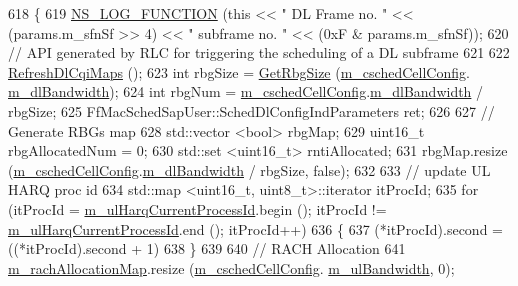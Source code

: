 \begin{DoxyCode}
618 \{
619   \hyperlink{log-macros-disabled_8h_a90b90d5bad1f39cb1b64923ea94c0761}{NS\_LOG\_FUNCTION} (\textcolor{keyword}{this} << \textcolor{stringliteral}{" DL Frame no. "} << (params.m\_sfnSf >> 4) << \textcolor{stringliteral}{" subframe no. "} << 
      (0xF & params.m\_sfnSf));
620   \textcolor{comment}{// API generated by RLC for triggering the scheduling of a DL subframe}
621 
622   \hyperlink{classns3_1_1RrFfMacScheduler_a537ddfed33bced7f9a5762128e025ece}{RefreshDlCqiMaps} ();
623   \textcolor{keywordtype}{int} rbgSize = \hyperlink{classns3_1_1RrFfMacScheduler_a65de621ce59a64d6b0a3a56c3904470a}{GetRbgSize} (\hyperlink{classns3_1_1RrFfMacScheduler_a809c6237863709f97fc450b1a2ba60d4}{m\_cschedCellConfig}.
      \hyperlink{structns3_1_1FfMacCschedSapProvider_1_1CschedCellConfigReqParameters_ad18c695bd3c9d7f742ba1dab4a941e8a}{m\_dlBandwidth});
624   \textcolor{keywordtype}{int} rbgNum = \hyperlink{classns3_1_1RrFfMacScheduler_a809c6237863709f97fc450b1a2ba60d4}{m\_cschedCellConfig}.\hyperlink{structns3_1_1FfMacCschedSapProvider_1_1CschedCellConfigReqParameters_ad18c695bd3c9d7f742ba1dab4a941e8a}{m\_dlBandwidth} / rbgSize;
625   FfMacSchedSapUser::SchedDlConfigIndParameters ret;
626 
627   \textcolor{comment}{// Generate RBGs map}
628   std::vector <bool> rbgMap;
629   uint16\_t rbgAllocatedNum = 0;
630   std::set <uint16\_t> rntiAllocated;
631   rbgMap.resize (\hyperlink{classns3_1_1RrFfMacScheduler_a809c6237863709f97fc450b1a2ba60d4}{m\_cschedCellConfig}.\hyperlink{structns3_1_1FfMacCschedSapProvider_1_1CschedCellConfigReqParameters_ad18c695bd3c9d7f742ba1dab4a941e8a}{m\_dlBandwidth} / rbgSize, \textcolor{keyword}{false});
632 
633   \textcolor{comment}{//   update UL HARQ proc id}
634   std::map <uint16\_t, uint8\_t>::iterator itProcId;
635   \textcolor{keywordflow}{for} (itProcId = \hyperlink{classns3_1_1RrFfMacScheduler_ad7674f8cb560202bc36a792f7b2755ca}{m\_ulHarqCurrentProcessId}.begin (); itProcId != 
      \hyperlink{classns3_1_1RrFfMacScheduler_ad7674f8cb560202bc36a792f7b2755ca}{m\_ulHarqCurrentProcessId}.end (); itProcId++)
636     \{
637       (*itProcId).second = ((*itProcId).second + 1) %
638     \}
639 
640   \textcolor{comment}{// RACH Allocation}
641   \hyperlink{classns3_1_1RrFfMacScheduler_ac3a35483a21997065f49ff72707a90aa}{m\_rachAllocationMap}.resize (\hyperlink{classns3_1_1RrFfMacScheduler_a809c6237863709f97fc450b1a2ba60d4}{m\_cschedCellConfig}.
      \hyperlink{structns3_1_1FfMacCschedSapProvider_1_1CschedCellConfigReqParameters_a5ab5b102878e6e7e7727a14af4a64d2f}{m\_ulBandwidth}, 0);

\end{DoxyCode}
